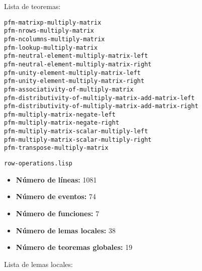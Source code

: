 \documentclass[a4paper,10pt]{article}
\begin{document}
\par \vspace{10pt}

Lista de teoremas:

\par \vspace{10pt}

\begin{lstlisting}[language=clips]
pfm-matrixp-multiply-matrix  
pfm-nrows-multiply-matrix
pfm-ncolumns-multiply-matrix
pfm-lookup-multiply-matrix
pfm-neutral-element-multiply-matrix-left
pfm-neutral-element-multiply-matrix-right 
pfm-unity-element-multiply-matrix-left
pfm-unity-element-multiply-matrix-right 
pfm-associativity-of-multiply-matrix 
pfm-distributivity-of-multiply-matrix-add-matrix-left
pfm-distributivity-of-multiply-matrix-add-matrix-right
pfm-multiply-matrix-negate-left
pfm-multiply-matrix-negate-right
pfm-multiply-matrix-scalar-multiply-left
pfm-multiply-matrix-scalar-multiply-right 
pfm-transpose-multiply-matrix
\end{lstlisting}

\par \vspace{24pt}
\texttt{row-operations.lisp}

\par \vspace{10pt}

\begin{itemize}
	\item \textbf{Número de líneas:} 1081
	\item \textbf{Número de eventos:} 74
	\item \textbf{Número de funciones:} 7
	\item \textbf{Número de lemas locales:} 38
	\item \textbf{Número de teoremas globales:} 19
\end{itemize}

\par \vspace{10pt}

Lista de lemas locales:

\par \vspace{10pt}
\end{document}
